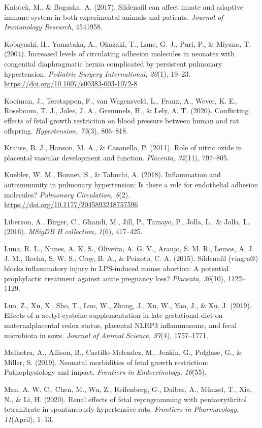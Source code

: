 \documentclass[authordate, empirical]{jote-new-article}
\begin{document}
Kniotek, M., \& Boguska, A. (2017). Sildenafil can affect innate and adaptive immune system in both experimental animals and patients. \emph{Journal of Immunology Research}, 4541958.

Kobayashi, H., Yamataka, A., Okazaki, T., Lane, G. J., Puri, P., \& Miyano, T. (2004). Increased levels of circulating adhesion molecules in neonates with congenital diaphragmatic hernia complicated by persistent pulmonary hypertension. \emph{Pediatric Surgery International, 20}(1), 19–23. \url{https://doi.org/10.1007/s00383-003-1072-8}

Kooiman, J., Terstappen, F., van Wagensveld, L., Franx, A., Wever, K. E., Roseboom, T. J., Joles, J. A., Gremmels, H., \& Lely, A. T. (2020). Conflicting effects of fetal growth restriction on blood pressure between human and rat offspring. \emph{Hypertension, 75}(3), 806–818.

Krause, B. J., Hanson, M. A., \& Casanello, P. (2011). Role of nitric oxide in placental vascular development and function. \emph{Placenta, 32}(11), 797–805.

Kuebler, W. M., Bonnet, S., \& Tabuchi, A. (2018). Inflammation and autoimmunity in pulmonary hypertension: Is there a role for endothelial adhesion molecules? \emph{Pulmonary Circulation, 8}(2). \url{https://doi.org/10.1177/2045893218757596}

Liberzon, A., Birger, C., Ghandi, M., Jill, P., Tamayo, P., Jolla, L., \& Jolla, L. (2016). \emph{MSigDB H collection, 1}(6), 417–425.

Luna, R. L., Nunes, A. K. S., Oliveira, A. G. V., Araujo, S. M. R., Lemos, A. J. J. M., Rocha, S. W. S., Croy, B. A., \& Peixoto, C. A. (2015). Sildenafil (viagra®) blocks inflammatory injury in LPS-induced mouse abortion: A potential prophylactic treatment against acute pregnancy loss? \emph{Placenta, 36}(10), 1122–1129.

Luo, Z., Xu, X., Sho, T., Luo, W., Zhang, J., Xu, W., Yao, J., \& Xu, J. (2019). Effects of n-acetyl-cysteine supplementation in late gestational diet on maternalplacental redox status, placental NLRP3 inflammasome, and fecal microbiota in sows. \emph{Journal of Animal Science, 97}(4), 1757–1771.

Malhotra, A., Allison, B., Castillo-Melendez, M., Jenkin, G., Polglase, G., \& Miller, S. (2019). Neonatal morbidities of fetal growth restriction: Pathophysiology and impact. \emph{Frontiers in Endocrinology, 10}(55).

Man, A. W. C., Chen, M., Wu, Z., Reifenberg, G., Daiber, A., Münzel, T., Xia, N., \& Li, H. (2020). Renal effects of fetal reprogramming with pentaerythritol tetranitrate in spontaneously hypertensive rats. \emph{Frontiers in Pharmacology, 11}(April), 1–13.
\end{document}
